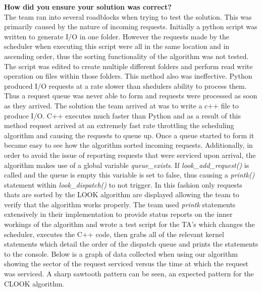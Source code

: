 \documentclass[10pt,onecolumn,draftclsnofoot]{IEEEtran} %
\begin{document}
\begin{singlespace}
        \textbf{How did you ensure your solution was correct?}\\

                \normalfont \indent The team ran into several roadblocks when trying to test the solution. This was primarily caused by the nature of incoming requests. Initially a python script was written to generate I/O in one folder. However the requests made by the scheduler when executing this script were all in the same location and in ascending order, thus the sorting functionality of the algorithm was not tested. The script was edited to create multiple different folders and perform read write operation on files within those folders. This method also was ineffective. Python produced I/O requests at a rate slower than shedulers ability to process them. Thus a request queue was never able to form and requests were processed as soon as they arrived. The solution the team arrived at was to write a c++ file to produce I/O. C++ executes much faster than Python and as a result of this method request arrived at an extremely fast rate throttling the scheduling algorithm and causing the requests to queue up. Once a queue started to form it became easy to see how the algorithm sorted incoming requests. Additionally, in order to avoid the issue of reporting requests that were serviced upon arrival, the algorithm makes use of a global variable \textit{queue\_exists}. If \textit{look\_add\_request()} is called and the queue is empty this variable is set to false, thus causing a \textit{printk()} statement within \textit{look\_dispatch()} to not trigger. In this fashion only requests thats are sorted by the LOOK algorithm are displayed allowing the team to verify that the algorithm works properly. The team used \textit{printk} statements extensively in their implementation to provide status reports on the inner workings of the algorithm and wrote a test script for the TA's which changes the scheduler, executes the C++ code, then grabs all of the relevant kernel statements which detail the order of the dispatch queue and prints the statements to the console. Below is a graph of data collected when using our algorithm showing the sector of the request serviced versus the time at which the request was serviced. A sharp sawtooth pattern can be seen, an expected pattern for the CLOOK algorithm.\\


\end{singlespace}
\end{document}

